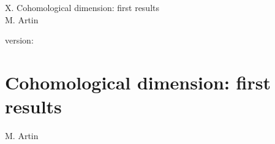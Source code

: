 \documentclass[10pt]{../fichiers-configuration-latex/smfart}
\begin{document}
\begin{center}
X. Cohomological dimension: first results\\
M. Artin
\end{center}

version: \showgitstatus
\tableofcontents

\else
\chapter{Cohomological dimension: first results}
\begin{center}
M. Artin
\end{center}
\fi
{}\label{sga4.exp.X}






\end{document}
